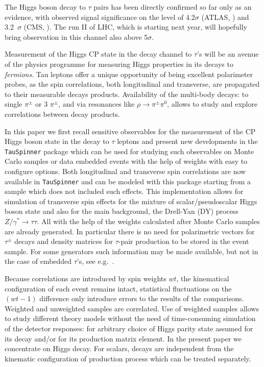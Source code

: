 \documentclass[12pt]{article}
\begin{document}
The Higgs boson decay to $\tau$ pairs has been directly confirmed so far only as an evidence, 
with observed signal significance on the level of 4.2$\sigma$ (ATLAS, \cite{ATLASHtautau}) and 3.2~$\sigma$ (CMS, \cite{CMSHTautau}).
The run II of LHC, which is starting next year, will hopefully bring observation in this channel also above 5$\sigma$.    

Measurement of the Higgs CP state in the decay channel to $\tau$'s will be an 
avenue of the physics programme for measuring Higgs properties in its decays to {\it fermions}. Tau leptons offer a unique
opportunity of being excellent polarimeter probes, as the spin correlations, both longitudinal 
and transverse, are propagated to their measurable decays products. 
Availability of the multi-body decays: to single $\pi^\pm$ or 3 $\pi^\pm$, 
and via resonances like $\rho\to \pi^\pm \pi^0$,  allows to study and explore correlations between 
decay products. 

In  this paper we first recall sensitive observables for the measurement of the
CP Higgs boson state in the decay to $\tau$ leptons and present new developments in the 
{\tt TauSpinner} package which can be used for studying such observables on 
 Monte Carlo samples or data embedded events with the help of weights with easy to configure options. Both longitudinal and 
 transverse spin 
correlations are now available in {\tt TauSpinner} \cite{Czyczula:2012ny,Banerjee:2012ez, TauSpinner2014} 
and can be modeled with this package 
starting from a sample which does not included such effects.  This implementation allows for simulation 
of transverse spin effects for the mixture of scalar/pseudoscalar Higgs boson state and also for 
the main background, the Drell-Yan (DY) process $Z/\gamma^* \to \tau \tau$. 
All with the help of the weights calculated after Monte Carlo samples are already generated. In particular there is no need for polarimetric vectors for $\tau^\pm $ decays and density matrices for $\tau$-pair 
production to be stored in the event sample.  For some generators 
such information may be made available,  
but not  in the case of embedded $\tau$'s, see e.g.~\cite{ATLASHtautau}. 

Because correlations are introduced  by spin weights $wt$, the kinematical configuration of each event remains
intact,  
 statistical fluctuations on the $(wt-1)$ difference only 
introduce errors to the results of  
the comparisons.  Weighted and unweighted samples are correlated.  
Use of weighted samples allows  to study different theory models
without the need of time-consuming simulation of  the
detector responses: for arbitrary 
choice of  Higgs parity state assumed for its decay and/or for its production matrix element.
In the present paper we  concentrate on Higgs decay. For scalars, decays are independent from the
kinematic configuration of  production process which can be treated separately. 
\end{document}
